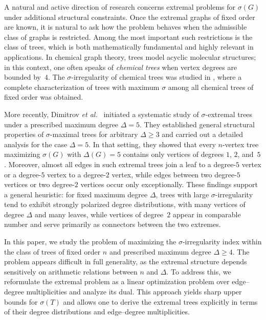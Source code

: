 \documentclass[preprint,12pt]{elsarticle}
\begin{document}
A natural and active direction of research concerns extremal problems for
$\sigma(G)$ under additional structural constraints.
Once the extremal graphs of fixed order are known, it is natural to ask how the
problem behaves when the admissible class of graphs is restricted.
Among the most important such restrictions is the class of trees, which is both
mathematically fundamental and highly relevant in applications.
In chemical graph theory, trees model acyclic molecular structures; in this
context, one often speaks of \emph{chemical trees} when vertex degrees are
bounded by~$4$.
The $\sigma$-irregularity of chemical trees was studied in
\cite{Kovijanic2024}, where a complete characterization of trees with maximum
$\sigma$ among all chemical trees of fixed order was obtained.

More recently, Dimitrov \emph{et al.}~\cite{Dimitrov2026} initiated a systematic
study of $\sigma$-extremal trees under a prescribed maximum degree $\Delta=5$.
They established general structural properties of $\sigma$-maximal trees for
arbitrary $\Delta\ge3$ and carried out a detailed analysis for the case
$\Delta=5$.
In that setting, they showed that every $n$-vertex tree maximizing $\sigma(G)$
with $\Delta(G)=5$ contains only vertices of degrees $1$, $2$, and~$5$.
Moreover, almost all edges in such extremal trees join a leaf to a degree-$5$
vertex or a degree-$5$ vertex to a degree-$2$ vertex, while edges between two
degree-$5$ vertices or two degree-$2$ vertices occur only exceptionally.
These findings support a general heuristic: for fixed maximum degree $\Delta$,
trees with large $\sigma$-irregularity tend to exhibit strongly polarized degree
distributions, with many vertices of degree $\Delta$ and many leaves, while
vertices of degree~$2$ appear in comparable number and serve primarily as
connectors between the two extremes.

In this paper, we study the problem of maximizing the $\sigma$-irregularity index
within the class of trees of fixed order $n$ and prescribed maximum degree
$\Delta\ge4$.
The problem appears difficult in full generality, as the extremal structure
depends sensitively on arithmetic relations between $n$ and $\Delta$.
To address this, we reformulate the extremal problem as a linear optimization
problem over edge–degree multiplicities and analyze its dual.
This approach yields sharp upper bounds for $\sigma(T)$ and allows one to derive
the extremal trees explicitly in terms of their degree distributions and
edge--degree multiplicities.
\end{document}
